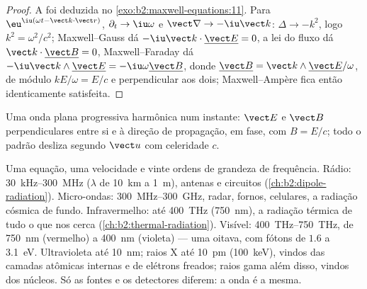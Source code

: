 \begin{proof}
A  foi deduzida no \cref{exo:b2:maxwell-equations:11}.
Para $\eu^{\iu(\omega t - \vect k\cdot\vect r)}$, $\partial_t \to \iu\omega$ e $\vect\nabla \to
-\iu\vect k$: $\Delta \to -k^2$, logo $k^2 = \omega^2/c^2$; Maxwell--Gauss dá $-\iu
\vect k\cdot\underline{\vect E} = 0$, a lei do fluxo dá $\vect k\cdot\underline{\vect B} = 0$,
Maxwell--Faraday dá $-\iu\vect k\wedge\underline{\vect E} = -\iu\omega\underline{\vect B}$, donde
$\underline{\vect B} = \vect k\wedge\underline{\vect E}/\omega$, de módulo $kE/\omega = E/c$ e
perpendicular aos dois; Maxwell--Ampère fica então identicamente satisfeita.
\end{proof}

\begin{omfigure}

{\small Uma onda plana progressiva harmônica num instante: $\vect E$ e
$\vect B$ perpendiculares entre si e à direção de propagação, em
fase, com $B = E/c$; todo o padrão desliza segundo $\vect u$ com celeridade $c$.}
\end{omfigure}

\begin{remark}[O espectro]\label{rem:b2:plane-waves-polarization:spectrum}
Uma equação, uma velocidade e vinte ordens de grandeza de frequência.
Rádio: \qty{30}{kHz}--\qty{300}{MHz} ($\lambda$ de \qty{10}{km} a \qty{1}{m}),
antenas e circuitos (\cref{ch:b2:dipole-radiation}). Micro-ondas:
\qty{300}{MHz}--\qty{300}{GHz}, radar, fornos, celulares, a radiação cósmica
de fundo. Infravermelho: até \qty{400}{THz} (\qty{750}{nm}), a radiação
térmica de tudo o que nos cerca (\cref{ch:b2:thermal-radiation}).
Visível: \qty{400}{THz}--\qty{750}{THz}, de \qty{750}{nm} (vermelho) a \qty{400}{nm}
(violeta) --- uma oitava, com fótons de $1.6$ a \qty{3.1}{eV}. Ultravioleta até
\qty{10}{nm}; raios X até \qty{10}{pm} (\qty{100}{keV}), vindos das camadas atômicas internas
e de elétrons freados; raios gama além disso, vindos dos núcleos. Só as fontes
e os detectores diferem: a onda é a mesma.
\end{remark}

